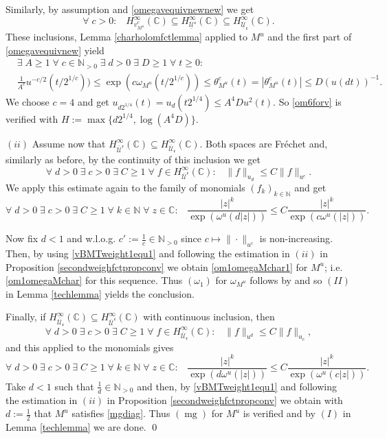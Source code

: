 \documentclass[10pt]{amsart}%
\numberwithin{equation}{section}
\theoremstyle{plain}
\newcommand{\CC}{\mathbb{C}}
\newcommand{\NN}{\mathbb{N}}
\let\on=\operatorname
\begin{document}
Similarly, by assumption and \eqref{omegavequivnewnew} we get
$$\forall\;c>0:\;\;\;H^{\infty}_{v^c_{M^u}}(\CC)\subseteq H^{\infty}_{\underline{\mathcal{U}}^{\mathfrak{c}}}(\CC)\subseteq H^{\infty}_{\underline{\mathcal{U}}_{\mathfrak{c}}}(\CC).$$
These inclusions, Lemma \ref{charholomfctlemma} applied to $M^u$ and the first part of \eqref{omegavequivnew} yield
\begin{align*}
&\exists\;A\ge 1\;\forall\;c\in\NN_{>0}\;\exists\;d>0\;\exists\;D\ge 1\;\forall\;t\ge 0:
\\&
\frac{1}{A^c}u^{-c/2}(t/2^{1/c}))\le\exp(c\omega_{M^u}(t/2^{1/c}))\le\theta^c_{M^u}(t)=|\theta^c_{M^u}(t)|\le D(u(dt))^{-1}.
\end{align*}
We choose $c=4$ and get $u_{d2^{1/4}}(t)=u_d(t2^{1/4})\le A^4Du^2(t)$. So \eqref{om6forv} is verified with $H:=\max\{d2^{1/4},\log(A^4D)\}$.\vspace{6pt}

$(ii)$ Assume now that $H^{\infty}_{\overline{\mathcal{U}}^{\mathfrak{c}}}(\CC)\subseteq H^{\infty}_{\overline{\mathcal{U}}_{\mathfrak{c}}}(\CC)$. Both spaces are Fr\'{e}chet and, similarly as before, by the continuity of this inclusion we get
$$\forall\;d>0\;\exists\;c>0\;\exists\;C\ge 1\;\forall\;f\in H^{\infty}_{\overline{\mathcal{U}}^{\mathfrak{c}}}(\CC):\;\;\; \|f\|_{u_d}\le C\|f\|_{u^c}.$$
We apply this estimate again to the family of monomials $(f_k)_{k\in\NN}$ and get
$$\forall\;d>0\;\exists\;c>0\;\exists\;C\ge 1\;\forall\;k\in\NN\;\forall\;z\in\CC:\;\;\;\frac{|z|^k}{\exp(\omega^u(d|z|))}\le C\frac{|z|^k}{\exp(c\omega^u(|z|))}.$$

Now fix $d<1$ and w.l.o.g. $c':=\frac{1}{c}\in\NN_{>0}$ since $c\mapsto\|\cdot\|_{u^c}$ is non-increasing. Then, by using \eqref{vBMTweight1equ1} and following the estimation in $(ii)$ in Proposition \ref{secondweighfctpropconv} we obtain \eqref{om1omegaMchar1} for $M^u$; i.e. \eqref{om1omegaMchar} for this sequence. Thus \hyperlink{om1}{$(\omega_1)$} for $\omega_{M^u}$ follows by \cite[Thm. 3.1]{subaddlike} and so $(II)$ in Lemma \ref{techlemma} yields the conclusion.\vspace{6pt}

Finally, if $H^{\infty}_{\overline{\mathcal{U}}_{\mathfrak{c}}}(\CC)\subseteq H^{\infty}_{\overline{\mathcal{U}}^{\mathfrak{c}}}(\CC)$ with continuous inclusion, then
$$\forall\;d>0\;\exists\;c>0\;\exists\;C\ge 1\;\forall\;f\in H^{\infty}_{\overline{\mathcal{U}}_{\mathfrak{c}}}(\CC):\;\;\; \|f\|_{u^d}\le C\|f\|_{u_c},$$
and this applied to the monomials gives
$$\forall\;d>0\;\exists\;c>0\;\exists\;C\ge 1\;\forall\;k\in\NN\;\forall\;z\in\CC:\;\;\;\frac{|z|^k}{\exp(d\omega^u(|z|))}\le C\frac{|z|^k}{\exp(\omega^u(c|z|))}.$$
Take $d<1$ such that $\frac{1}{d}\in\NN_{>0}$ and then, by \eqref{vBMTweight1equ1} and following the estimation in $(ii)$ in Proposition \ref{secondweighfctpropconv} we obtain with $d:=\frac{1}{2}$ that $M^u$ satisfies \eqref{mgdiag}. Thus \hyperlink{mg}{$(\on{mg})$} for $M^u$ is verified and by $(I)$ in Lemma \ref{techlemma} we are done.
\qed\enddemo
\end{document}
